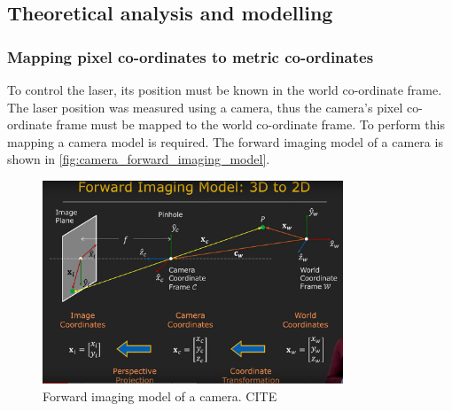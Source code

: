 \subsection{Theoretical analysis and modelling}

\subsubsection{Mapping pixel co-ordinates to metric co-ordinates}

To control the laser, its position must be known in the world co-ordinate frame. The laser position was measured using a camera, thus the camera's pixel co-ordinate frame must be mapped to the world co-ordinate frame. To perform this mapping a camera model is required. The forward imaging model of a camera is shown in \autoref{fig:camera_forward_imaging_model}.
\begin{figure}
    \centering
    \includegraphics[width=0.8\textwidth]{figures/camera/forward_imaging_model.png}
    \caption{Forward imaging model of a camera. CITE}
    \label{fig:camera_forward_imaging_model}
\end{figure}

